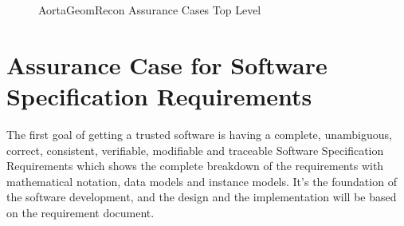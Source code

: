 \begin{figure}[H]
    \centering
    \caption[AortaGeomRecon Assurance Cases Top Level]{AortaGeomRecon Assurance Cases Top Level}
    \label{fig_agr_ac_top}
\end{figure}


\section{Assurance Case for Software Specification Requirements}

The first goal of getting a trusted software is having a complete, unambiguous, correct, consistent, verifiable, modifiable and traceable Software Specification Requirements \citep{SRS} which shows the complete breakdown of the requirements with mathematical notation, data models and instance models. It's the foundation of the software development, and the design and the implementation will be based on the requirement document.


